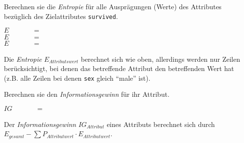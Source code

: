\documentclass[10pt, a4paper]{scrartcl}
\begin{document}
\begin{aufgabe}
	Berechnen sie die \emph{Entropie} für alle Ausprägungen (Werte) des Attributes \linie[4cm] bezüglich des Zielattributes \texttt{survived}.
	
	\begin{center}
		$E_{\hspace{2cm}} = $\linie[12cm]\\[.4cm]
		$E_{\hspace{2cm}} = $\linie[12cm]\\[.4cm]
		$E_{\hspace{2cm}} = $\linie[12cm]
	\end{center}
	
	\begin{infobox}
		Die \emph{Entropie} $E_{Attributswert}$ berechnet sich wie oben, allerdings werden nur Zeilen berücksichtigt, bei denen das betreffende Attribut den betreffenden Wert hat (z.B. alle Zeilen bei denen \texttt{sex} gleich \enquote{male} ist).
	\end{infobox}
\end{aufgabe}

\begin{aufgabe}
	Berechnen sie den \emph{Informationsgewinn} für ihr Attribut.
	
	\begin{center}
		$IG_{\hspace{2cm}} = $\linie[12cm]
	\end{center}
	
	\begin{infobox}
		Der \emph{Informationsgewinn} $IG_{Attribut}$ eines Attributs berechnet sich durch $E_{gesamt} - \sum{P_{Attributwert}\cdot E_{Attributwert}}$.
	\end{infobox}
\end{aufgabe}
\end{document}
